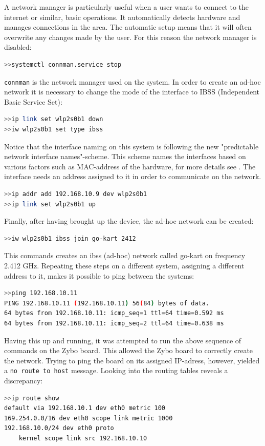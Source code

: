 A network manager is particularly useful when a user wants to connect to the internet or similar, basic operations.
It automatically detects hardware and manages connections in the area.
The automatic setup means that it will often overwrite any changes made by the user.
For this reason the network manager is disabled:
\begin{lstlisting}[language=bash]
>>systemctl connman.service stop
\end{lstlisting}
\texttt{connman} is the network manager used on the system.
In order to create an ad-hoc network it is necessary to change the mode of the interface to IBSS (Independent Basic Service Set):
\begin{lstlisting}[language=bash]
>>ip link set wlp2s0b1 down
>>iw wlp2s0b1 set type ibss
\end{lstlisting}
Notice that the interface naming on this system is following the new "predictable network interface names"-scheme.
This scheme names the interfaces based on various factors such as MAC-address of the hardware, for more details see \cite{interfacenaming}.
The interface needs an address assigned to it in order to communicate on the network.
\begin{lstlisting}[language=bash]
>>ip addr add 192.168.10.9 dev wlp2s0b1
>>ip link set wlp2s0b1 up
\end{lstlisting}
Finally, after having brought up the device, the ad-hoc network can be created:
\begin{lstlisting}[language=bash]
>>iw wlp2s0b1 ibss join go-kart 2412
\end{lstlisting}
This commands creates an ibss (ad-hoc) network called go-kart on frequency 2.412 \si{\giga\hertz}.
Repeating these steps on a different system, assigning a different address to it, makes it possible to ping between the systems: 
\begin{lstlisting}[language=bash]
>>ping 192.168.10.11
PING 192.168.10.11 (192.168.10.11) 56(84) bytes of data.
64 bytes from 192.168.10.11: icmp_seq=1 ttl=64 time=0.592 ms
64 bytes from 192.168.10.11: icmp_seq=2 ttl=64 time=0.638 ms
\end{lstlisting}
Having this up and running, it was attempted to run the above sequence of commands on the Zybo board.
This allowed the Zybo board to correctly create the network.
Trying to ping the board on its assigned IP-adress, however, yielded a \texttt{no route to host} message.
Looking into the routing tables reveals a discrepancy:
\begin{lstlisting}[language=bash]
>>ip route show
default via 192.168.10.1 dev eth0 metric 100 
169.254.0.0/16 dev eth0 scope link metric 1000 
192.168.10.0/24 dev eth0 proto 
	kernel scope link src 192.168.10.10 
\end{lstlisting}
